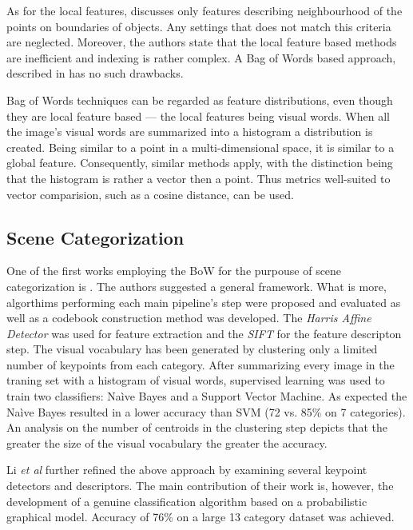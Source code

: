 \documentclass[a4paper,12pt]{article}
\begin{document}
  As for the local features, \cite{toldo2009bag} discusses only features describing neighbourhood of the points on boundaries of objects. Any settings that does not match this criteria are neglected. Moreover, the authors state that the local feature based methods are inefficient and indexing is rather complex. A Bag of Words based approach, described in \cite{li2010investigating} has no such drawbacks.
   
	Bag of Words techniques can be regarded as feature distributions, even though they are local feature based --- the local features being visual words. When all the image's visual words are summarized into a histogram a distribution is created. Being similar to a point in a multi-dimensional space, it is similar to a global feature. Consequently, similar methods apply, with the distinction being that the histogram is rather a vector then a point. Thus metrics well-suited to vector comparision, such as a cosine distance, can be used.
  
  \subsection{Scene Categorization}
  
  One of the first works employing the BoW for the purpouse of scene categorization is \cite{csurka2004visual}. The authors suggested a general framework. What is more, algorthims performing each main pipeline's step were proposed and evaluated as well as a codebook construction method was developed. The \emph{Harris Affine Detector} was used for feature extraction and the \emph{SIFT} for the feature descripton step. The visual vocabulary has been generated by clustering only a limited number of keypoints from each category. After summarizing every image in the traning set with a histogram of visual words, supervised learning was used to train two classifiers: Na\`ive Bayes and a Support Vector Machine. As expected the Na\`ive Bayes resulted in a lower accuracy than SVM (72 vs. 85\% on 7 categories). An analysis on the number of centroids in the clustering step depicts that the greater the size of the visual vocabulary the greater the accuracy. 
  
  Li \emph{et al} further refined the above approach by examining several keypoint detectors and descriptors. The main contribution of their work is, however, the development of a genuine classification algorithm based on a probabilistic graphical model. Accuracy of 76\% on a large 13 category dataset was achieved.
  
\end{document}
